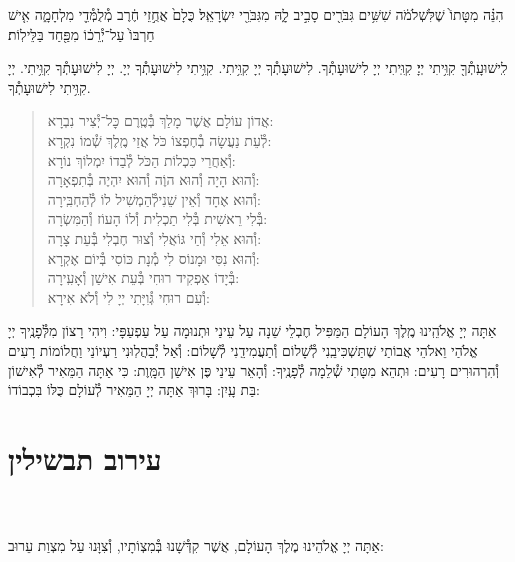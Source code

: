 \documentclass[twoside, openany, parskip=half, 11pt]{book}
\begin{document}
הִנֵּ֗ה מִטָּתוֹ֙ שֶׁלִּשְׁלֹמֹ֔ה שִׁשִּׁ֥ים גִּבֹּרִ֖ים סָבִ֣יב לָ֑הּ מִגִּבֹּרֵ֖י יִשְׂרָאֵֽל׃ כֻּלָם֙ אֲחֻ֣זֵי חֶ֔רֶב מְ֯לֻמְּ֯דֵ֖י מִלְחָמָ֑ה אִ֤ישׁ חַרְבּוֹ֙ עַל־יְ֯רֵכ֔וֹ מִפַּ֖חַד בַּלֵּילֽוֹת׃


לִֽישׁוּעָֽתְ֯ךָ֖ קִוִּ֥יתִי יְיָ׃ קִוִּֽיתִי יְיָ לִישׁוּעָתְ֯ךָ. לִישׁוּעָתְ֯ךָ יְיָ קִוִּ֥יתִי. קִוִּ֥יתִי לִישׁוּעָתְ֯ךָ יְיָ. יְיָ לִישׁוּעָתְ֯ךָ קִוִּ֥יתִי. יְיָ קִוִּ֥יתִי לִישׁוּעָתְ֯ךָ.

\vspace{-\baselineskip}
\begin{quote}

אֲדוֹן עוֹלָם אֲשֶׁר מָלַךְ \hfill בְּ֯טֶֽרֶם כׇּל־יְ֯צִיר נִבְרָא:\\
לְ֯עֵת נַעֲשָׂה בְ֯חֶפְצוֹ כֹּל \hfill אֲזַי מֶֽלֶךְ שְׁ֯מוֹ נִקְרָא:\\
וְ֯אַחֲרֵי כִּכְלוֹת הַכֹּל \hfill לְ֯בַדוֹ יִמְלוֹךְ נוֹרָא:\\
וְ֯הוּא הָיָה וְ֯הוּא הוֶֹה \hfill וְ֯הוּא יִהְיֶה בְּ֯תִפְאָרָה:\\
וְ֯הוּא אֶחָד וְ֯אֵין שֵׁנִי\hfill לְ֯הַמְשִׁיל לוֹ לְ֯הַחְבִּֽירָה:\\
בְּ֯לִי רֵאשִׁית בְּ֯לִי תַכְלִית \hfill וְ֯לוֹ הָעוֹז וְ֯הַמִּשְׂרָה:\\
וְ֯הוּא אֵלִי וְ֯חַי גּוֹאֲלִי \hfill וְ֯צוּר חֶבְלִי בְּ֯עֵת צָרָה:\\
וְ֯הוּא נִסִּי וּמָנוֹס לִי \hfill מְ֯נָת כּוֹסִי בְּ֯יוֹם אֶקְרָא:\\
בְּ֯יָדוֹ אַפְקִיד רוּחִי \hfill בְּ֯עֵת אִישַׁן וְ֯אָעִֽירָה:\\
וְ֯עִם רוּחִי גְּ֯וִיָּתִי \hfill יְיָ לִי וְ֯לֹא אִירָא:

\end{quote}


אַתָּה יְיָ אֱלֹהֵֽינוּ מֶֽלֶךְ הָעוֹלָם הַמַּפִּיל חֶבְלֵי שֵׁנָה עַל עֵינַי וּתְנוּמָה עַל עַפְעַפָּי: וִיהִי רָצוֹן מִלְּ֯פָנֶֽיךָ יְיָ אֱלֹהַי וֵאלֹהֵי אֲבוֹתַי שֶׁתַּשְׁכִּיבֵֽנִי לְ֯שָׁלוֹם וְ֯תַעֲמִידֵֽנִי לְ֯שָׁלוֹם: וְ֯אַל יְ֯בַהֲלֽוּנִי רַעְיוֹנַי וַחֲלוֹמוֹת רָעִים וְ֯הִרְהוּרִים רָעִים: וּתְהֵא מִטָּתִי שְׁ֯לֵמָה לְ֯פָנֶֽיךָ: וְ֯הָאֵר עֵינַי פֶּן אִישַׁן הַמָּֽוֶת: כִּי אַתָּה הַמֵּאִיר לְ֯אִישׁוֹן בַּת עָֽיִן: בָּרוּךְ אַתָּה יְיָ הַמֵּאִיר לְ֯עוֹלָם כֻּלּוֹ בִּכְבוֹדוֹ:


\chapter[עירוב תבשילין]{ עירוב תבשילין }

\\
\\
אַתָּה יְיָ אֱלֹהֵינוּ מֶלֶךְ הָעוֹלָם, אֲשֶׁר קִדְּ֯שָׁנוּ בְּ֯מִצְוֹתָיו, וְ֯צִוָּנוּ עַל מִצְוַת עֵרוּב:
\end{document}
